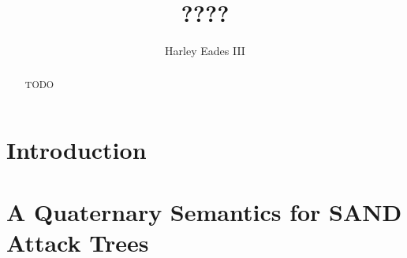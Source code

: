 \documentclass{llncs}
\date{}
\begin{document}
\title{????}

\author{Harley Eades III}

\maketitle 

\begin{abstract}
  TODO
\end{abstract}

\section{Introduction}
\label{sec:introduction}

\section{A Quaternary Semantics for SAND Attack Trees}
\label{sec:a_quaternary_semantics_for_sand_attack_trees}






\end{document}
